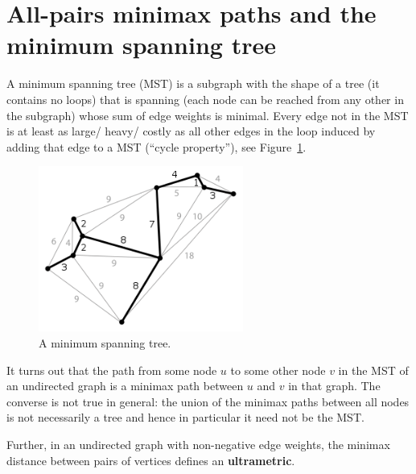 \section{All-pairs minimax paths and the minimum spanning tree}
A minimum spanning tree (MST) is a subgraph with the shape of a tree (\ie it
contains no loops) that is spanning (\ie each node can be reached from any other
in the subgraph) whose sum of edge weights is minimal. Every edge not in the MST
is at least as large/ heavy/ costly as all other edges in the loop induced by
adding that edge to a MST (``cycle property''), see Figure~\ref{fig:mst}.
\begin{figure}[htpb]
  \centering \includegraphics[width=0.6\textwidth]{Figures/MST}
  \caption{A minimum spanning tree.}%
  \label{fig:mst}
\end{figure}

It turns out that the path from some node $u$ to some other node $v$ in the MST
of an undirected graph is a minimax path between $u$ and $v$ in that graph. The
converse is not true in general: the union of the minimax paths between all
nodes is not necessarily a tree and hence in particular it need not be the MST.

Further, in an undirected graph with non-negative edge weights, the minimax
distance between pairs of vertices defines an \textbf{ultrametric}.


